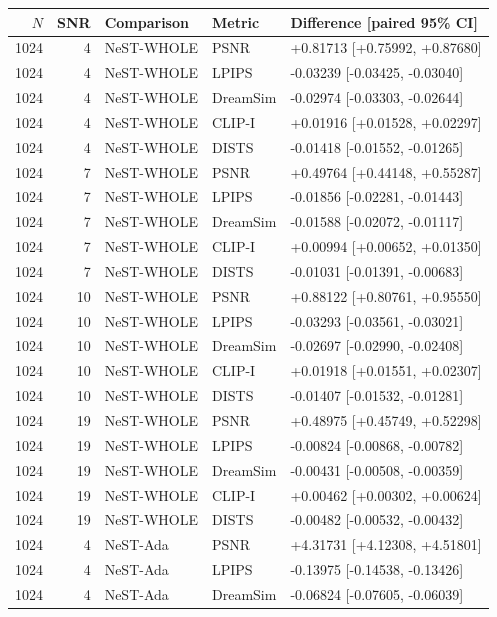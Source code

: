 \documentclass[10pt,letterpaper]{article}
\begin{document}
\begin{longtable}{@{}rrlll@{}}\toprule
$N$ & SNR & Comparison & Metric & Difference [paired 95\% CI]\\\midrule\endhead
1024 & 4 & NeST-WHOLE & PSNR & +0.81713 [+0.75992, +0.87680]\\
1024 & 4 & NeST-WHOLE & LPIPS & -0.03239 [-0.03425, -0.03040]\\
1024 & 4 & NeST-WHOLE & DreamSim & -0.02974 [-0.03303, -0.02644]\\
1024 & 4 & NeST-WHOLE & CLIP-I & +0.01916 [+0.01528, +0.02297]\\
1024 & 4 & NeST-WHOLE & DISTS & -0.01418 [-0.01552, -0.01265]\\
1024 & 7 & NeST-WHOLE & PSNR & +0.49764 [+0.44148, +0.55287]\\
1024 & 7 & NeST-WHOLE & LPIPS & -0.01856 [-0.02281, -0.01443]\\
1024 & 7 & NeST-WHOLE & DreamSim & -0.01588 [-0.02072, -0.01117]\\
1024 & 7 & NeST-WHOLE & CLIP-I & +0.00994 [+0.00652, +0.01350]\\
1024 & 7 & NeST-WHOLE & DISTS & -0.01031 [-0.01391, -0.00683]\\
1024 & 10 & NeST-WHOLE & PSNR & +0.88122 [+0.80761, +0.95550]\\
1024 & 10 & NeST-WHOLE & LPIPS & -0.03293 [-0.03561, -0.03021]\\
1024 & 10 & NeST-WHOLE & DreamSim & -0.02697 [-0.02990, -0.02408]\\
1024 & 10 & NeST-WHOLE & CLIP-I & +0.01918 [+0.01551, +0.02307]\\
1024 & 10 & NeST-WHOLE & DISTS & -0.01407 [-0.01532, -0.01281]\\
1024 & 19 & NeST-WHOLE & PSNR & +0.48975 [+0.45749, +0.52298]\\
1024 & 19 & NeST-WHOLE & LPIPS & -0.00824 [-0.00868, -0.00782]\\
1024 & 19 & NeST-WHOLE & DreamSim & -0.00431 [-0.00508, -0.00359]\\
1024 & 19 & NeST-WHOLE & CLIP-I & +0.00462 [+0.00302, +0.00624]\\
1024 & 19 & NeST-WHOLE & DISTS & -0.00482 [-0.00532, -0.00432]\\
1024 & 4 & NeST-Ada & PSNR & +4.31731 [+4.12308, +4.51801]\\
1024 & 4 & NeST-Ada & LPIPS & -0.13975 [-0.14538, -0.13426]\\
1024 & 4 & NeST-Ada & DreamSim & -0.06824 [-0.07605, -0.06039]\\

\end{longtable}
\end{document}
